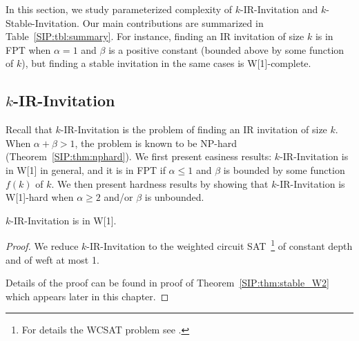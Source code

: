 In this section, we study parameterized complexity of $k$-IR-Invitation and $k$-Stable-Invitation.
Our main contributions are summarized in Table~\ref{SIP:tbl:summary}. For instance, finding an IR invitation of size $k$ is in FPT when $\alpha = 1$ and $\beta$ is a positive constant (bounded above by some function of $k$), but finding a stable invitation in the same cases is W[1]-complete. 
 

\subsection{$k$-IR-Invitation}

Recall that $k$-IR-Invitation is the problem of finding an IR invitation of size $k$.
When $\alpha + \beta > 1$, the problem is known to be NP-hard (Theorem~\ref{SIP:thm:nphard}). 
We first present easiness results: $k$-IR-Invitation is in W[1] in general, and it is in FPT if $\alpha \leq 1$ and $\beta$ is bounded by some function $f(k)$ of $k$.
We then present hardness results by showing that $k$-IR-Invitation is W[1]-hard when $\alpha \geq 2$ and/or $\beta$ is unbounded.


\begin{theorem} \label{SIP:thm:IR_invitation_W1}
	$k$-IR-Invitation is in W[1].
\end{theorem} 
\begin{proof}
	We reduce $k$-IR-Invitation to the weighted circuit SAT~\footnote{For details the WCSAT problem see \cite{creignou2015parameterized}.} of constant depth and of weft at most 1. 
	
	Details of the proof can be found in proof of Theorem~\ref{SIP:thm:stable_W2} which appears later in this chapter.
\end{proof}


